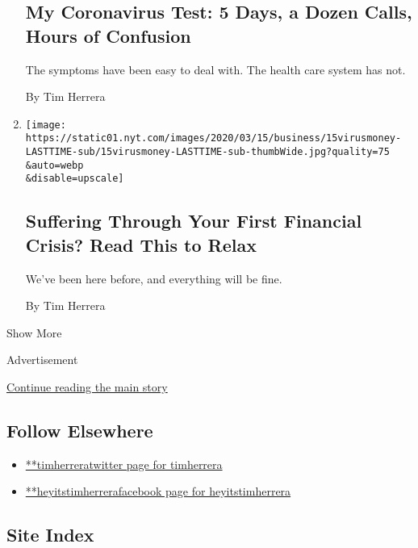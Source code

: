 \begin{enumerate}
  \hypertarget{my-coronavirus-test-5-days-a-dozen-calls-hours-of-confusion}{%
  \subsection{My Coronavirus Test: 5 Days, a Dozen Calls, Hours of
  Confusion}\label{my-coronavirus-test-5-days-a-dozen-calls-hours-of-confusion}}

  The symptoms have been easy to deal with. The health care system has
  not.

  By Tim Herrera
\item
  \href{/2020/03/15/smarter-living/corona-stock-market-tips-dealing-with-financial-crash-crisis.html}{}

  \texttt{[image: https://static01.nyt.com/images/2020/03/15/business/15virusmoney-LASTTIME-sub/15virusmoney-LASTTIME-sub-thumbWide.jpg?quality=75\\\&auto=webp\\\&disable=upscale]}

  \hypertarget{suffering-through-your-first-financial-crisis-read-this-to-relax}{%
  \subsection{Suffering Through Your First Financial Crisis? Read This
  to
  Relax}\label{suffering-through-your-first-financial-crisis-read-this-to-relax}}

  We've been here before, and everything will be fine.

  By Tim Herrera
\end{enumerate}

Show More

Advertisement

\protect\hyperlink{after-mid2}{Continue reading the main story}

\hypertarget{follow-elsewhere}{%
\subsection{Follow Elsewhere}\label{follow-elsewhere}}

\begin{itemize}
\tightlist
\item
  \href{https://twitter.com/timherrera}{**timherreratwitter page for
  timherrera}
\item
  \href{https://www.facebook.com/heyitstimherrera}{**heyitstimherrerafacebook
  page for heyitstimherrera}
\end{itemize}

\hypertarget{site-index}{%
\subsection{Site Index}\label{site-index}}

